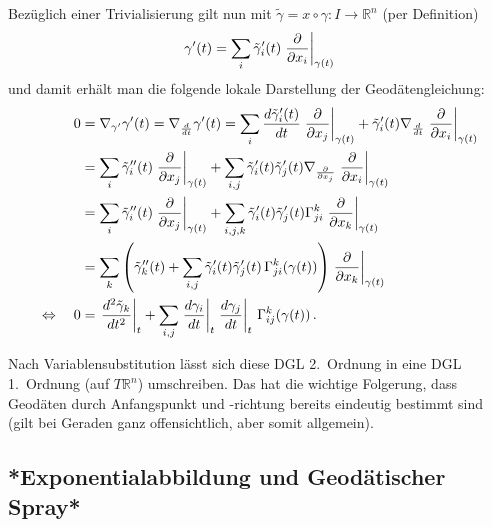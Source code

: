\documentclass[../H_Analysis_main.tex]{subfiles}
\begin{document}
Bezüglich einer Trivialisierung gilt nun mit $\tilde{\gamma} = x \circ \gamma: I \rightarrow \mathbb{R}^n$ (per Definition)
\begin{equation*}
\gamma'(t) = \sum_i \tilde{\gamma}_i'(t) \eval{\pdv{x_i}}_{\gamma(t)}
\end{equation*}
und damit erhält man die folgende lokale Darstellung der Geodätengleichung:
\begin{align}
0 &= \nabla_{\gamma'} \gamma'(t) = \nabla_{\dv{t}} \gamma'(t) = \sum_i \dv{\tilde{\gamma}_i'(t)}{t} \eval{\pdv{x_j}}_{\gamma(t)} + \tilde{\gamma}_i'(t) \nabla_{\dv{t}} \eval{\pdv{x_i}}_{\gamma(t)}
\notag\\
&= \sum_i \tilde{\gamma}_i''(t) \eval{\pdv{x_j}}_{\gamma(t)} + \sum_{i, j} \tilde{\gamma}_i'(t) \tilde{\gamma}_j'(t) \nabla_{\pdv{x_j}} \eval{\pdv{x_i}}_{\gamma(t)}
\notag\\
&= \sum_i \tilde{\gamma}_i''(t) \eval{\pdv{x_j}}_{\gamma(t)} + \sum_{i, j, k} \tilde{\gamma}_i'(t) \tilde{\gamma}_j'(t) \Gamma_{ji}^k \eval{\pdv{x_k}}_{\gamma(t)}
\notag\\
&= \sum_k \qty(\tilde{\gamma}_k''(t) + \sum_{i, j} \tilde{\gamma}_i'(t) \tilde{\gamma}_j'(t) \, \Gamma_{ji}^k(\gamma(t))) \eval{\pdv{x_k}}_{\gamma(t)}
\notag\\
\Leftrightarrow \quad 0 &= \eval{\dv[2]{\tilde{\gamma}_k}{t}}_t + \sum_{i, j} \eval{\dv{\gamma_i}{t}}_t \eval{\dv{\gamma_j}{t}}_t \, \Gamma_{ij}^k(\gamma(t)) \, .
\end{align}

Nach Variablensubstitution lässt sich diese DGL 2.~Ordnung in eine DGL 1.~Ordnung (auf $T \mathbb{R}^n$) umschreiben. Das hat die wichtige Folgerung, dass Geodäten durch Anfangspunkt und -richtung bereits eindeutig bestimmt sind (gilt bei Geraden ganz offensichtlich, aber somit allgemein).\\



		\subsection{*Exponentialabbildung und Geodätischer Spray*}

\end{document}
